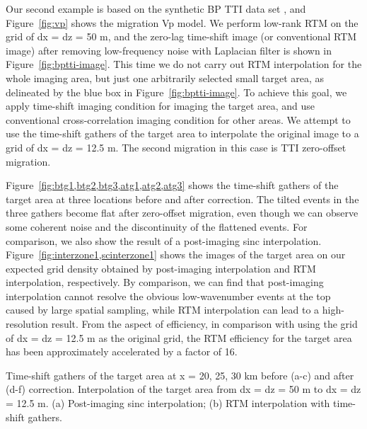 Our second example is based on the synthetic BP TTI data set \cite[]{shah07}, and Figure~\ref{fig:vp} shows the migration Vp model.
We perform low-rank RTM \cite[]{fomel13,sun16} on the grid of dx = dz = 50 m,
and the zero-lag time-shift image (or conventional RTM image) after removing low-frequency noise with Laplacian filter is shown in Figure~\ref{fig:bptti-image}.
This time we do not carry out RTM interpolation for the whole imaging area,
but just one arbitrarily selected small target area, as delineated by the blue box in Figure~\ref{fig:bptti-image}.
To achieve this goal, we apply time-shift imaging condition for imaging the target area,
and use conventional cross-correlation imaging condition for other areas.
We attempt to use the time-shift gathers of the target area to interpolate the original image to a grid of dx = dz = 12.5 m.
The second migration in this case is TTI zero-offset migration.

Figure~\ref{fig:btg1,btg2,btg3,atg1,atg2,atg3} shows the time-shift gathers of the target area at three locations before and after correction.
The tilted events in the three gathers become flat after zero-offset migration, even though we can observe some coherent noise and the discontinuity of the flattened events.
For comparison, we also show the result of a post-imaging sinc interpolation.
Figure~\ref{fig:interzone1,scinterzone1} shows the images of the target area on our expected grid density
obtained by post-imaging interpolation and RTM interpolation, respectively.
By comparison, we can find that post-imaging interpolation cannot resolve
the obvious low-wavenumber events at the top caused by large spatial sampling,
while RTM interpolation can lead to a high-resolution result.
From the aspect of efficiency, in comparison with using the grid of dx = dz = 12.5 m as the original grid, the RTM efficiency for the target area has been approximately accelerated by a factor of 16.

{Time-shift gathers of the target area at x = 20, 25, 30 km before (a-c) and after (d-f) correction.}
{Interpolation of the target area from dx = dz = 50 m to dx = dz = 12.5 m.
(a) Post-imaging sinc interpolation; (b) RTM interpolation with time-shift gathers.}

